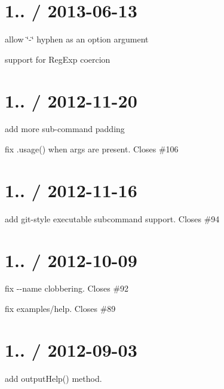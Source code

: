 \section*{1.. / 2013-\/06-\/13 }


\begin{DoxyItemize}
\item allow \char`\"{}-\/\char`\"{} hyphen as an option argument
\item support for Reg\+Exp coercion
\end{DoxyItemize}

\section*{1.. / 2012-\/11-\/20 }


\begin{DoxyItemize}
\item add more sub-\/command padding
\item fix .usage() when args are present. Closes \#106
\end{DoxyItemize}

\section*{1.. / 2012-\/11-\/16 }


\begin{DoxyItemize}
\item add git-\/style executable subcommand support. Closes \#94
\end{DoxyItemize}

\section*{1.. / 2012-\/10-\/09 }


\begin{DoxyItemize}
\item fix {\ttfamily -\/-\/name} clobbering. Closes \#92
\item fix examples/help. Closes \#89
\end{DoxyItemize}

\section*{1.. / 2012-\/09-\/03 }


\begin{DoxyItemize}
\item add {\ttfamily output\+Help()} method.
\end{DoxyItemize}

